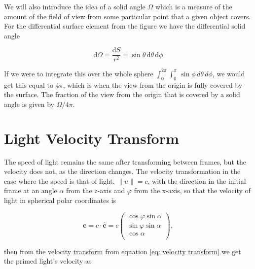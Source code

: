 We will also introduce the idea of a solid angle $\Omega$ which is a measure of the amount of the field of view from some particular point that a given object covers. For the differential surface element from the figure we have the differential solid angle

\begin{equation} \label{eq: solid angle}
	\mathrm{d}\Omega = \frac{\mathrm{d}S}{r^2} = \sin\theta \,\mathrm{d}\theta \,\mathrm{d}\phi
\end{equation}%

If we were to integrate this over the whole sphere $ \int_{0}^{2\pi} \int_{0}^{\pi} \, \sin \phi \, d\theta \, d\phi$, we would get this equal to $4\pi$, which is when the view from the origin is fully covered by the surface.
The fraction of the view from the origin that is covered by a solid angle is given by $\Omega/ 4\pi$.

\section{Light Velocity Transform} \label{sect: Light Velocity Transform}

The speed of light remains the same after transforming between frames, but the velocity does not, as the direction changes.
The velocity transformation in the case where the speed is that of light, $\|u\| = {c}$, with the direction in the initial frame at an angle $\alpha$ from the z-axis and $\varphi$ from the x-axis, so that the velocity of light in spherical polar coordinates is

\begin{equation}
	\mathbf{c} = {c} \cdot {\mathbf{\hat{c}}}= {c}
	\begin{pmatrix}
		\cos{\varphi}\sin{\alpha} \\
		\sin{\varphi}\sin{\alpha} \\
		\cos{\alpha}              \\
	\end{pmatrix},
\end{equation}

then from the velocity \hyperlink{def-transform}{transform} from equation \eqref{eq: velocity transform} we get the primed light's velocity as


